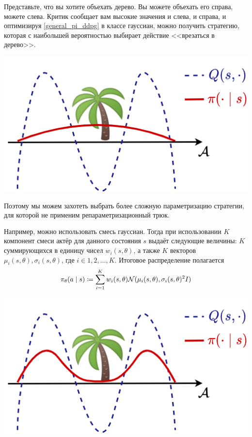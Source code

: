 \begin{exampleBox}[righthand ratio=0.35, sidebyside, sidebyside align=center, lower separated=false]{}
Представьте, что вы хотите объехать дерево. Вы можете объехать его справа, можете слева. Критик сообщает вам высокие значения и слева, и справа, и оптимизируя \eqref{general_pi_ddpg} в классе гауссиан, можно получить стратегию, которая с наибольшей вероятностью выбирает действие <<врезаться в дерево>>.

\tcblower
\includegraphics[width=\textwidth]{Images/Multimodal1.png}
\end{exampleBox}

Поэтому мы можем захотеть выбрать более сложную параметризацию стратегии, для которой не применим репараметризационный трюк.

\begin{exampleBox}[label=ex:gaussianmixture_policy, righthand ratio=0.35, sidebyside, sidebyside align=center, lower separated=false]{}
Например, можно использовать смесь гауссиан. Тогда при использовании $K$ компонент смеси актёр для данного состояния $s$ выдаёт следующие величины: $K$ суммирующихся в единицу чисел $w_i(s, \theta)$, а также $K$ векторов $\mu_i(s, \theta), \sigma_i(s, \theta)$, где $i \in {1, 2, \dots, K}$. Итоговое распределение полагается
$$\pi_\theta(a \mid s) \coloneqq \sum_{i = 1}^K w_i(s, \theta) \mathcal{N}(\mu_i(s, \theta), \sigma_i(s, \theta)^2I)$$

\tcblower
\includegraphics[width=\textwidth]{Images/Multimodal2.png}
\end{exampleBox}


